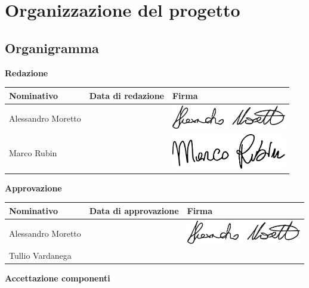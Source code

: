 	\section{Organizzazione del progetto}
	\subsection{Organigramma}
	
\textbf{Redazione}
\begin{center}
	\begin{tabular}{ | p{4cm} | p{3.5cm} | p{5cm} |}
	\hline
     Nominativo & Data di redazione & Firma \\ \hline
     Alessandro Moretto & & \includegraphics[width=5cm]{Commons/Pics/Signatures/Moretto.pdf}\\ \hline
     Marco Rubin & &\includegraphics[width=5cm]{Commons/Pics/Signatures/Rubin.pdf} \\ \hline
     \end{tabular}
	\end{center}
\textbf{Approvazione}
	\begin{center}
	\begin{tabular}{ | p{4cm} | p{3.5cm} | p{5cm} |}
	\hline
     Nominativo & Data di approvazione & Firma \\ \hline
     Alessandro Moretto & & \includegraphics[width=5cm]{Commons/Pics/Signatures/Moretto.pdf}\\ \hline
     Tullio Vardanega & & \\ \hline
     \end{tabular}
	\end{center}
\textbf{Accettazione componenti}
